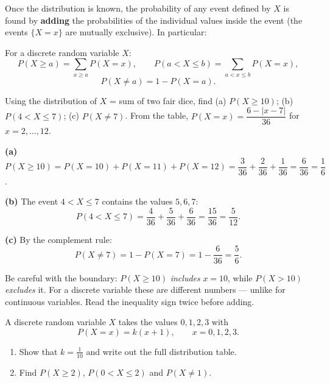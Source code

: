 \documentclass[11pt]{article}
\begin{document}
Once the distribution is known, the probability of any event defined by $X$ is found by \textbf{adding} the probabilities of the individual values inside the event (the events $\{X = x\}$ are mutually exclusive). In particular:

\begin{propriete}
For a discrete random variable $X$:
\[ P(X \ge a) = \sum_{x \ge a} P(X = x), \qquad
P(a < X \le b) = \sum_{a < x \le b} P(X = x), \]
\[ P(X \ne a) = 1 - P(X = a). \]
\end{propriete}

\begin{exoresolu}
Using the distribution of $X$ = sum of two fair dice, find (a) $P(X \ge 10)$; (b) $P(4 < X \le 7)$; (c) $P(X \ne 7)$.
\tcblower
From the table, $P(X = x) = \dfrac{6 - |x - 7|}{36}$ for $x = 2, \dots, 12$.

\textbf{(a)} $P(X \ge 10) = P(X=10) + P(X=11) + P(X=12) = \dfrac{3}{36} + \dfrac{2}{36} + \dfrac{1}{36} = \dfrac{6}{36} = \dfrac{1}{6}$.

\textbf{(b)} The event $4 < X \le 7$ contains the values $5, 6, 7$:
\[ P(4 < X \le 7) = \frac{4}{36} + \frac{5}{36} + \frac{6}{36} = \frac{15}{36} = \frac{5}{12}. \]

\textbf{(c)} By the complement rule:
\[ P(X \ne 7) = 1 - P(X = 7) = 1 - \frac{6}{36} = \frac{5}{6}. \]
\end{exoresolu}

\begin{attention}
Be careful with the boundary: $P(X \ge 10)$ \emph{includes} $x = 10$, while $P(X > 10)$ \emph{excludes} it. For a discrete variable these are different numbers — unlike for continuous variables. Read the inequality sign twice before adding.
\end{attention}

\begin{exercice}[Practice]
A discrete random variable $X$ takes the values $0, 1, 2, 3$ with
\[ P(X = x) = k(x + 1), \qquad x = 0, 1, 2, 3. \]
\begin{enumerate}
\item Show that $k = \tfrac{1}{10}$ and write out the full distribution table.
\item Find $P(X \ge 2)$, $P(0 < X \le 2)$ and $P(X \ne 1)$.
\end{enumerate}
\end{exercice}
\end{document}
